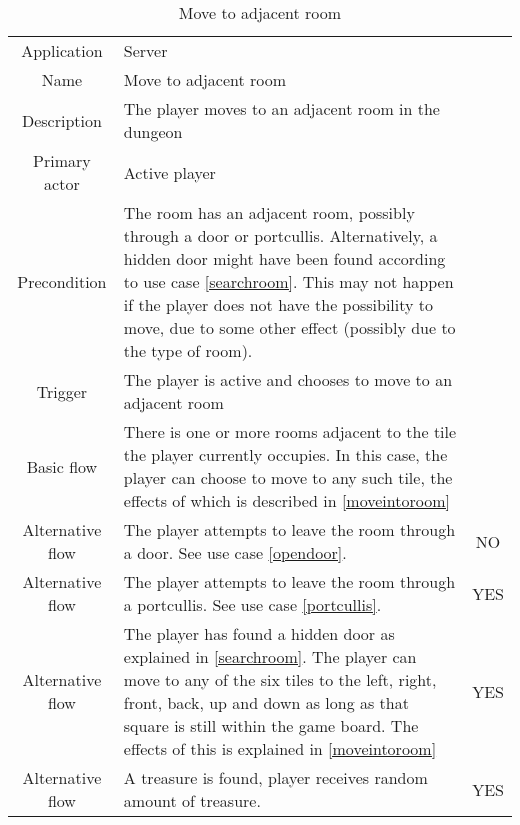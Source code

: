 \begin{table}
\caption{Move to adjacent room}
\label{moveoutfromroom}
\begin{tabular}{|c| p{9cm}|c}
\hline
Application & Server & \\
Name & Move to adjacent room & \\
Description & The player moves to an adjacent room in the dungeon & \\
Primary actor & Active player & \\
Precondition & The room has an adjacent room, possibly through a door or portcullis. Alternatively, a hidden door might have been found according to use case \ref{searchroom}. This may not happen if the player does not have the possibility to move, due to some other effect (possibly due to the type of room). & \\
Trigger & The player is active and chooses to move to an adjacent room  & \\ \hline
Basic flow & There is one or more rooms adjacent to the tile the player currently occupies. In this case, the player can choose to move to any such tile, the effects of which is described in \ref{moveintoroom} & \\ \hline
Alternative flow & The player attempts to leave the room through a door. See use case \ref{opendoor}. & NO \\\hline
Alternative flow & The player attempts to leave the room through a portcullis. See use case \ref{portcullis}. & YES \\ \hline
Alternative flow & The player has found a hidden door as explained in \ref{searchroom}. The player can move to any of the six tiles to the left, right, front, back, up and down as long as that square is still within the game board. The effects of this is explained in \ref{moveintoroom} & YES \\ \hline
Alternative flow & A treasure is found, player receives random amount of treasure. & YES \\
\hline
\end{tabular}
\end{table}

